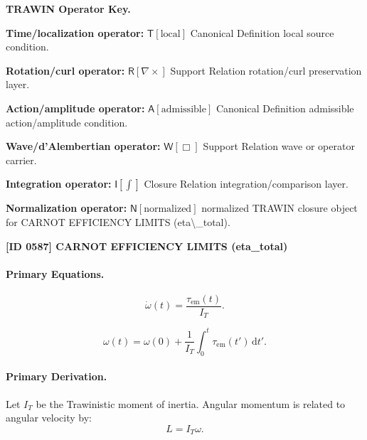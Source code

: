 \par\vspace{0.45\baselineskip}
\noindent\begin{minipage}[t]{\linewidth}
\begingroup
\small
\raggedright
\textbf{TRAWIN Operator Key.}\par
\noindent\textbf{Time/localization operator:} $\mathsf{T}\!\left[\mathrm{local}\right]$ Canonical Definition local source condition.\par
\noindent\textbf{Rotation/curl operator:} $\mathsf{R}\!\left[\nabla\times\right]$ Support Relation rotation/curl preservation layer.\par
\noindent\textbf{Action/amplitude operator:} $\mathsf{A}\!\left[\mathrm{admissible}\right]$ Canonical Definition admissible action/amplitude condition.\par
\noindent\textbf{Wave/d'Alembertian operator:} $\mathsf{W}\!\left[\Box\right]$ Support Relation wave or operator carrier.\par
\noindent\textbf{Integration operator:} $\mathsf{I}\!\left[\int\right]$ Closure Relation integration/comparison layer.\par
\noindent\textbf{Normalization operator:} $\mathsf{N}\!\left[\mathrm{normalized}\right]$ normalized TRAWIN closure object for CARNOT EFFICIENCY LIMITS (eta\textbackslash{}\_total).\par
\endgroup
\end{minipage}

\clearpage
\noindent\textbf{[ID 0587] CARNOT EFFICIENCY LIMITS (eta\_total)}\par
\vspace{0.35em}
\paragraph{Primary Equations.}
\begin{equation}
\dot{\omega}(t)
=
\frac{\tau_{\mathrm{em}}(t)}{I_T}.
\end{equation}

\begin{equation}
\omega(t)
=
\omega(0)
+
\frac{1}{I_T}
\int_0^t
\tau_{\mathrm{em}}(t')
\,\mathrm{d}t' .
\end{equation}

\paragraph{Primary Derivation.}
Let $I_T$ be the Trawinistic moment of inertia.  
Angular momentum is related to angular velocity by:
\begin{equation}
L=I_T\omega .
\end{equation}

